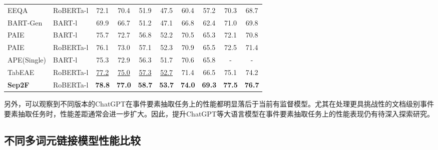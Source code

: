 \begin{table*}[htp]
\begin{tabular}{llcccccccc}
\multicolumn{1}{l}{EEQA}  & \multicolumn{1}{l}{RoBERTa-l}   & 72.1 & 70.4 & 51.9 & 47.5 & 60.4 & 57.2 & 70.3 & 68.7 \\  
\multicolumn{1}{l}{BART-Gen}  & \multicolumn{1}{l}{BART-l}   & 69.9 & 66.7 & 51.2 & 47.1 & 66.8 & 62.4 & 71.0 & 69.8 \\
\multicolumn{1}{l}{PAIE}  & \multicolumn{1}{l}{BART-l} 
& 75.7 & 72.7 & 56.8 & 52.2 & 70.5 & 65.3 & 72.1 & 70.8 \\
\multicolumn{1}{l}{PAIE}  & \multicolumn{1}{l}{RoBERTa-l}   & 76.1 & 73.0 & 57.1 & 52.3 & 70.9 & 65.5 & 72.5 & 71.4 \\
\multicolumn{1}{l}{APE(Single)}  & \multicolumn{1}{l}{BART-l} & 75.3 & 72.9 & 56.3 & 51.7 & 70.6 & 65.8 & - & - \\
\multicolumn{1}{l}{TabEAE}  & \multicolumn{1}{l}{RoBERTa-l}
& \underline{77.2} & \underline{75.0} & \underline{57.3} & \underline{52.7} & 71.4 & 66.5 & 75.1 & 74.2 \\
\multicolumn{1}{l}{\textbf{Sep2F}}   & \multicolumn{1}{l}{RoBERTa-l}  & \textbf{78.8} & \textbf{77.0} & \textbf{58.7} & \textbf{53.7} & \textbf{74.0} & \textbf{69.3} & \textbf{77.5} & \textbf{76.7} \\
\bottomrule
\end{tabular}
\label{overall}
\end{table*}

另外，可以观察到不同版本的ChatGPT在事件要素抽取任务上的性能都明显落后于当前有监督模型。尤其在处理更具挑战性的文档级别事件要素抽取任务时，性能差距通常会进一步扩大。因此，提升ChatGPT等大语言模型在事件要素抽取任务上的性能表现仍有待深入探索研究。

\subsection{不同多词元链接模型性能比较}

